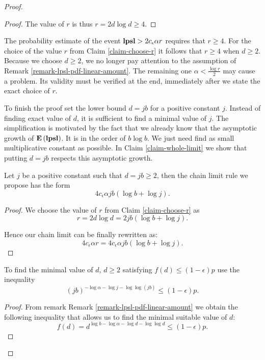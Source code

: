 \begin{proof}
\begin{proof}
The value of $r$ is thus $r = 2d \log d \geq 4$.
\end{proof}

The probability estimate of the event $\mathbf{lpsl} > 2 c_\epsilon \alpha r$ requires that $r \geq 4$. For the choice of the value $r$ from Claim \ref{claim-choose-r} it follows that $r \geq 4$ when $d \geq 2$. Because we choose $d \geq 2$, we no longer pay attention to the assumption of Remark \ref{remark-lpsl-pdf-linear-amount}. The remaining one $\alpha < \frac{\log r}{2}$ may cause a problem. Its validity must be verified at the end, immediately after we state the exact choice of $r$.

To finish the proof set the lower bound $d = j b$ for a positive constant $j$. Instead of finding exact value of $d$, it is sufficient to find a minimal value of $j$. The simplification is motivated by the fact that we already know that the asymptotic growth of $\mathbf{E}\left(\mathbf{lpsl}\right)$. It is in the order of $b \log b$. We just need find as small multiplicative constant as possible. In Claim \ref{claim-whole-limit} we show that putting $d = jb$ respects this asymptotic growth.

\begin{claim}
\label{claim-whole-limit}
Let $j$ be a positive constant such that $d = jb \geq 2 $, then the chain limit rule we propose has the form \[ 4 c_\epsilon \alpha j b (\log b + \log j) \text{.} \]
\end{claim}
\begin{proof}
We choose the value of $r$ from Claim \ref{claim-choose-r} as
\[
	r = 2 d \log d = 2 j b (\log b + \log j) \text{.}
\]

Hence our chain limit can be finally rewritten as:
\[
	4 c_\epsilon \alpha r = 4 c_\epsilon \alpha j b (\log b + \log j) \text{.}
\]
\end{proof}

\begin{claim}
To find the minimal value of $d$, $d \geq 2$ satisfying $f(d) \leq (1 - \epsilon) p$ use the inequality
\begin{equation}
\label{inequality-formula-j}
	\left(j b\right)^{-\log \alpha -\log j - \log \log (j b)} \leq (1 - \epsilon)p \text{.}
\end{equation}
\end{claim}
\begin{proof}
From remark Remark \ref{remark-lpsl-pdf-linear-amount} we obtain the following inequality that allows us to find the minimal suitable value of $d$:
\[
	f(d) = d ^ {\log b - \log \alpha - \log d - \log \log d} \leq (1 - \epsilon) p \text{.}
\]


\end{proof}
\end{proof}
